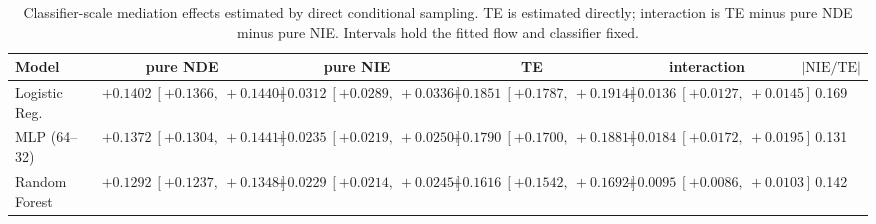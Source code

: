 \begin{table}[htbp]
  \centering
  \caption{Classifier-scale mediation effects estimated by direct conditional sampling. TE is estimated directly; interaction is TE minus pure NDE minus pure NIE. Intervals hold the fitted flow and classifier fixed.}
  \label{tab:adult_gap_overall}
  \begin{tabular}{lccccc}
    \toprule
    Model & pure NDE & pure NIE & TE & interaction & $|\mathrm{NIE}/\mathrm{TE}|$ \\
    \midrule
    Logistic Reg. & $+0.1402\ [+0.1366,\ +0.1440]$ & $+0.0312\ [+0.0289,\ +0.0336]$ & $+0.1851\ [+0.1787,\ +0.1914]$ & $+0.0136\ [+0.0127,\ +0.0145]$ & 0.169 \\
    MLP (64--32) & $+0.1372\ [+0.1304,\ +0.1441]$ & $+0.0235\ [+0.0219,\ +0.0250]$ & $+0.1790\ [+0.1700,\ +0.1881]$ & $+0.0184\ [+0.0172,\ +0.0195]$ & 0.131 \\
    Random Forest & $+0.1292\ [+0.1237,\ +0.1348]$ & $+0.0229\ [+0.0214,\ +0.0245]$ & $+0.1616\ [+0.1542,\ +0.1692]$ & $+0.0095\ [+0.0086,\ +0.0103]$ & 0.142 \\
    \bottomrule
  \end{tabular}
\end{table}